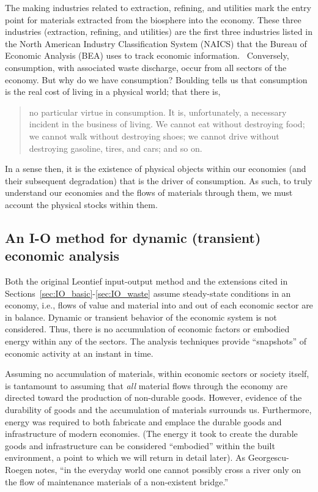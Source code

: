 The making industries related to extraction, 
refining, and utilities mark the entry point for 
materials extracted from the biosphere into the economy. 
These three industries (extraction, refining, and utilities) 
are the first three industries listed in the 
North American Industry Classification System 
(NAICS) that the 
Bureau of Economic Analysis (BEA) uses 
to track economic information.~\cite[Table B, p.~25]{Lawson2002}
Conversely, consumption, with associated waste
discharge, occur from all sectors of the economy.
But why do we have consumption?
Boulding tells us that consumption is the 
real cost of living in a physical world;
that there is,
\begin{quotation}
no particular virtue in consumption. 
It is, unfortunately, 
a necessary incident in the business of living. 
We cannot eat without destroying food; 
we cannot walk without destroying shoes; 
we cannot drive without destroying gasoline, 
tires, and cars; and so on.\cite[p.2]{Boulding1945}
\end{quotation}
In a sense then,
it is the existence of physical objects within our economies
(and their subsequent degradation)
that is the driver of consumption.
As such,
to truly understand our economies and the 
flows of materials through them,
we must account the physical stocks within them.


\subsection{An I-O method for dynamic (transient) economic analysis}
\label{sec:IO_dynamic}

Both the original Leontief input-output method
and the extensions cited in Sections~\ref{sec:IO_basic}-\ref{sec:IO_waste} 
assume steady-state conditions in an economy, 
i.e., flows of value and material into 
and out of each economic sector are in balance. 
Dynamic or transient behavior 
of the economic system is not considered. 
Thus, there is no accumulation of economic factors
or embodied energy
within any of the sectors. 
The analysis techniques provide ``snapshots'' 
of economic activity at an instant in time.

Assuming no accumulation of materials, 
within economic sectors or society itself, 
is tantamount to assuming that \emph{all} material flows 
through the economy are directed toward 
the production of non-durable goods. 
However, evidence of the durability of goods 
and the accumulation of materials surrounds us. 
Furthermore, 
energy was required to both fabricate and emplace 
the durable goods and infrastructure of modern economies. 
(The energy it took to create the durable goods and infrastructure 
can be considered ``embodied'' within the built environment, 
a point to which we will return in detail later). 
As Georgescu-Roegen notes, 
``in the everyday world one cannot possibly cross a river 
only on the flow of maintenance materials 
of a non-existent bridge.''~\cite{G-R1975}

